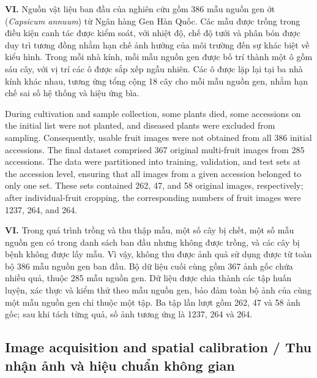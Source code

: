 \documentclass[final,1p,11pt,longtitle]{elsarticle}
\newenvironment{viet}{\par\smallskip\begingroup\color{viColor}\noindent\textbf{VI. }\ignorespaces}{\par\endgroup\smallskip}
\begin{document}
\begin{viet}
Nguồn vật liệu ban đầu của nghiên cứu gồm 386 mẫu nguồn gen ớt (\textit{Capsicum annuum}) từ Ngân hàng Gen Hàn Quốc. Các mẫu được trồng trong điều kiện canh tác được kiểm soát, với nhiệt độ, chế độ tưới và phân bón được duy trì tương đồng nhằm hạn chế ảnh hưởng của môi trường đến sự khác biệt về kiểu hình. Trong mỗi nhà kính, mỗi mẫu nguồn gen được bố trí thành một ô gồm sáu cây, với vị trí các ô được sắp xếp ngẫu nhiên. Các ô được lặp lại tại ba nhà kính khác nhau, tương ứng tổng cộng 18 cây cho mỗi mẫu nguồn gen, nhằm hạn chế sai số hệ thống và hiệu ứng bìa.
\end{viet}




During cultivation and sample collection, some plants died, some accessions on the initial list were not planted, and diseased plants were excluded from sampling. Consequently, usable fruit images were not obtained from all 386 initial accessions. The final dataset comprised 367 original multi-fruit images from 285 accessions. The data were partitioned into training, validation, and test sets at the accession level, ensuring that all images from a given accession belonged to only one set. These sets contained 262, 47, and 58 original images, respectively; after individual-fruit cropping, the corresponding numbers of fruit images were 1237, 264, and 264.

\begin{viet}
Trong quá trình trồng và thu thập mẫu, một số cây bị chết, một số mẫu nguồn gen có trong danh sách ban đầu nhưng không được trồng, và các cây bị bệnh không được lấy mẫu. Vì vậy, không thu được ảnh quả sử dụng được từ toàn bộ 386 mẫu nguồn gen ban đầu. Bộ dữ liệu cuối cùng gồm 367 ảnh gốc chứa nhiều quả, thuộc 285 mẫu nguồn gen. Dữ liệu được chia thành các tập huấn luyện, xác thực và kiểm thử theo mẫu nguồn gen, bảo đảm toàn bộ ảnh của cùng một mẫu nguồn gen chỉ thuộc một tập. Ba tập lần lượt gồm 262, 47 và 58 ảnh gốc; sau khi tách từng quả, số ảnh tương ứng là 1237, 264 và 264.
\end{viet}



\subsection*{Image acquisition and spatial calibration / {\color{viColor} Thu nhận ảnh và hiệu chuẩn không gian}}
\end{document}
